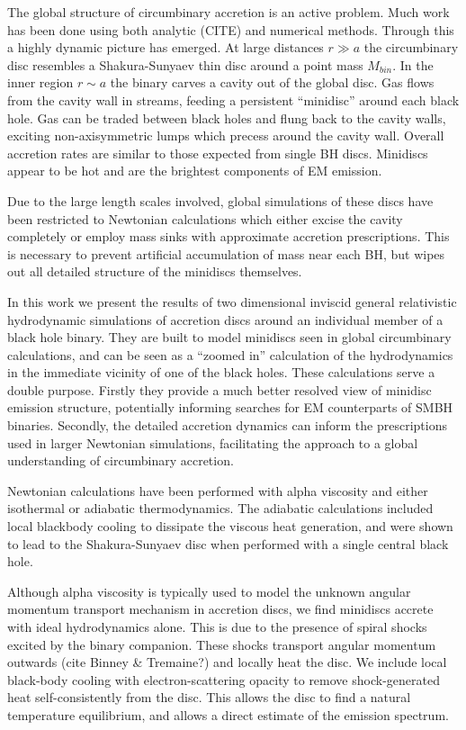 \documentclass{emulateapj}
\begin{document}
The global structure of circumbinary accretion is an active problem.  Much work has been done using both analytic (CITE) %
 and numerical \citep{MacFadyen08, Noble12, DOrazio12, Farris14, Farris15A, Farris15B, DOrazio16}
  methods. Through this a highly dynamic picture has emerged.  At large distances $r \gg a$ the circumbinary disc resembles a Shakura-Sunyaev thin disc around a point mass $M_{bin}$.  In the inner region $r \sim a$ the binary carves a cavity out of the global disc.  Gas flows from the cavity wall in streams, feeding a persistent ``minidisc'' around each black hole.  Gas can be traded between black holes and flung back to the cavity walls, exciting non-axisymmetric lumps which precess around the cavity wall. Overall accretion rates are similar to those expected from single BH discs.  Minidiscs appear to be hot and are the brightest components of EM emission.

Due to the large length scales involved, global simulations of these discs have been restricted to Newtonian calculations which either excise the cavity completely or employ mass sinks with approximate accretion prescriptions.  This is necessary to prevent artificial accumulation of mass near each BH, but wipes out all detailed structure of the minidiscs themselves.

In this work we present the results of two dimensional inviscid general relativistic hydrodynamic simulations of accretion discs around an individual member of a black hole binary. They are built to model minidiscs seen in global circumbinary calculations, and can be seen as a ``zoomed in'' calculation of the hydrodynamics in the immediate vicinity of one of the black holes.  These calculations serve a double purpose. Firstly they provide a much better resolved view of minidisc emission structure, potentially informing searches for EM counterparts of SMBH binaries.  Secondly, the detailed accretion dynamics can inform the prescriptions used in larger Newtonian simulations, facilitating the approach to a global understanding of circumbinary accretion.

Newtonian calculations have been performed with alpha viscosity and either isothermal \citep{Farris14} or adiabatic \citep{Farris15A, Farris15B} thermodynamics. The adiabatic calculations included local blackbody cooling to dissipate the viscous heat generation, and were shown to lead to the Shakura-Sunyaev disc when performed with a single central black hole.

Although alpha viscosity is typically used to model the unknown angular 
momentum transport mechanism in accretion discs, we find minidiscs accrete with
ideal hydrodynamics alone.  This is due to the presence of spiral shocks excited by the binary companion. These shocks transport angular momentum outwards (cite Binney \& Tremaine?) and locally heat the disc. We include local 
black-body cooling with electron-scattering opacity to remove shock-generated
heat self-consistently from the disc.  This allows the disc to find a natural
temperature equilibrium, and allows a direct estimate of the emission spectrum.
\end{document}

